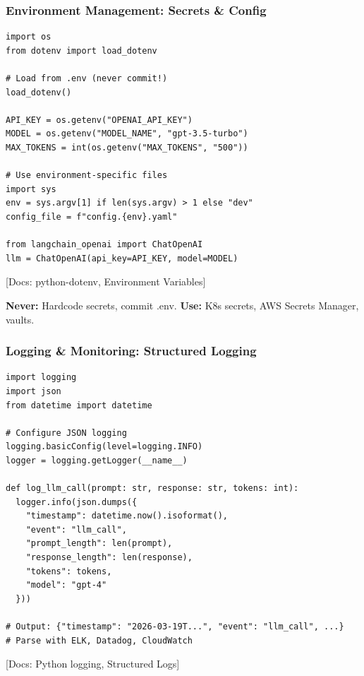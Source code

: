 \documentclass[aspectratio=169,11pt]{beamer}
\newcommand{\docref}[1]{{\scriptsize\color{docgray}[Docs: #1]}}
\begin{document}
\begin{frame}[fragile]
\frametitle{Environment Management: Secrets \& Config}

\begin{lstlisting}
import os
from dotenv import load_dotenv

# Load from .env (never commit!)
load_dotenv()

API_KEY = os.getenv("OPENAI_API_KEY")
MODEL = os.getenv("MODEL_NAME", "gpt-3.5-turbo")
MAX_TOKENS = int(os.getenv("MAX_TOKENS", "500"))

# Use environment-specific files
import sys
env = sys.argv[1] if len(sys.argv) > 1 else "dev"
config_file = f"config.{env}.yaml"

from langchain_openai import ChatOpenAI
llm = ChatOpenAI(api_key=API_KEY, model=MODEL)
\end{lstlisting}

\docref{python-dotenv, Environment Variables}

\small\textbf{Never:} Hardcode secrets, commit .env. \textbf{Use:} K8s secrets, AWS Secrets Manager, vaults.

\end{frame}

\begin{frame}[fragile]
\frametitle{Logging \& Monitoring: Structured Logging}

\begin{lstlisting}
import logging
import json
from datetime import datetime

# Configure JSON logging
logging.basicConfig(level=logging.INFO)
logger = logging.getLogger(__name__)

def log_llm_call(prompt: str, response: str, tokens: int):
  logger.info(json.dumps({
    "timestamp": datetime.now().isoformat(),
    "event": "llm_call",
    "prompt_length": len(prompt),
    "response_length": len(response),
    "tokens": tokens,
    "model": "gpt-4"
  }))

# Output: {"timestamp": "2026-03-19T...", "event": "llm_call", ...}
# Parse with ELK, Datadog, CloudWatch
\end{lstlisting}

\docref{Python logging, Structured Logs}

\end{frame}
\end{document}
